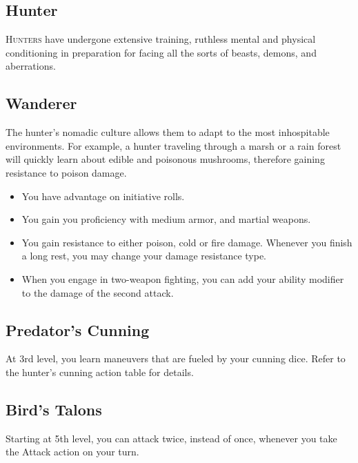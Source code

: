 
\begin{multicols*}{2}

\section{Hunter}

\lettrine[lines=3, lhang=0.15, loversize=0.25, findent=.5em]{H}{unters} have undergone extensive training, ruthless mental and physical conditioning in preparation for facing all the sorts of beasts, demons, and aberrations.

\subsection*{Wanderer}

The hunter's nomadic culture allows them to adapt to the most inhospitable environments. For example, a hunter traveling through a marsh or a rain forest will quickly learn about edible and poisonous mushrooms, therefore gaining resistance to poison damage.



\begin{itemize}
    \item You have advantage on initiative rolls.
    \item You gain you proficiency with medium armor, and martial weapons.
    \item You gain resistance to either poison, cold or fire damage. Whenever you finish a long rest, you may change your damage resistance type.
    \item When you engage in two-weapon fighting, you can add your ability modifier to the damage of the second attack.    
\end{itemize}


\subsection*{Predator's Cunning}

At 3rd level, you learn maneuvers that are fueled by your cunning dice. Refer to the hunter's cunning action table for details.

\subsection*{Bird's Talons}

Starting at 5th level, you can attack twice, instead of once, whenever you take the Attack action on your turn.


\end{multicols*}
